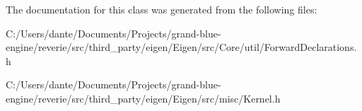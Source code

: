 The documentation for this class was generated from the following files\+:\begin{DoxyCompactItemize}
\item 
C\+:/\+Users/dante/\+Documents/\+Projects/grand-\/blue-\/engine/reverie/src/third\+\_\+party/eigen/\+Eigen/src/\+Core/util/Forward\+Declarations.\+h\item 
C\+:/\+Users/dante/\+Documents/\+Projects/grand-\/blue-\/engine/reverie/src/third\+\_\+party/eigen/\+Eigen/src/misc/Kernel.\+h\end{DoxyCompactItemize}
